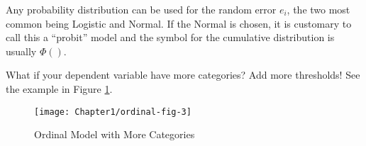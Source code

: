 Any probability distribution can be used for the random error $e_{i}$,
the two most common being Logistic and Normal. If the Normal is chosen,
it is customary to call this a ``probit'' model and the symbol for
the cumulative distribution is usually $\Phi()$.

What if your dependent variable have more categories? Add more thresholds!
See the example in Figure \ref{fig:Ordinal-5cat}.

\begin{figure}
\begin{centering}
\par\end{centering}
\begin{centering}
\texttt{[image: Chapter1/ordinal-fig-3]}
\par\end{centering}
\caption{Ordinal Model with More Categories\label{fig:Ordinal-5cat}}
\end{figure}

